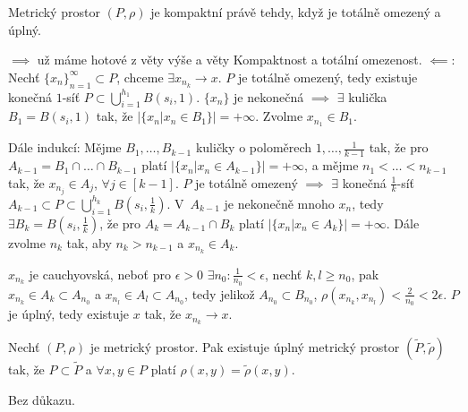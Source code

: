 \documentclass[12pt]{article}					%
\begin{document}
		\begin{veta}
			Metrický prostor $(P, \rho)$ je kompaktní právě tehdy, když je totálně omezený a úplný.

			\begin{dukazin}
				$\implies$ už máme hotové z věty výše a věty Kompaktnost a totální omezenost. $\impliedby$: Nechť $\{x_n\}_{n=1}^∞ \subset P$, chceme $\exists x_{n_k} \rightarrow x$. $P$ je totálně omezený, tedy existuje konečná $1$-síť $P \subset \bigcup_{i=1}^{h_1} B(s_i, 1)$. $\{x_n\}$ je nekonečná $\implies$ $\exists$ kulička $B_1 = B(s_i, 1)$ tak, že $|\{x_n | x_n \in B_1\}| = +∞$. Zvolme $x_{n_1} \in B_1$.

				Dále indukcí: Mějme $B_1, …, B_{k-1}$ kuličky o poloměrech $1, …, \frac{1}{k-1}$ tak, že pro $A_{k-1} = B_1 \cap … \cap B_{k-1}$ platí $|\{x_n | x_n \in A_{k-1}\}| = +∞$, a mějme $n_1 < … < n_{k-1}$ tak, že $x_{n_j} \in A_j$, $\forall j \in [k-1]$. $P$ je totálně omezený $\implies$ $\exists$ konečná $\frac{1}{k}$-síť $A_{k-1} \subset P \subset \bigcup_{i=1}^{h_k} B(s_i, \frac{1}{k})$. V $A_{k-1}$ je nekonečně mnoho $x_n$, tedy $\exists B_k = B(s_i, \frac{1}{k})$, že pro $A_k = A_{k-1} \cap B_k$ platí $|\{x_n | x_n \in A_k\}| = +∞$. Dále zvolme $n_k$ tak, aby $n_k > n_{k-1}$ a $x_{n_k} \in A_k$.

				$x_{n_k}$ je cauchyovská, neboť pro $\epsilon > 0$ $\exists n_0: \frac{1}{n_0} < \epsilon$, nechť $k, l ≥ n_0$, pak $x_{n_k} \in A_k \subset A_{n_0}$ a $x_{n_l} \in A_l \subset A_{n_0}$, tedy jelikož $A_{n_0} \subset B_{n_0}$, $\rho(x_{n_k}, x_{n_l}) < \frac{2}{n_0} < 2\epsilon$. $P$ je úplný, tedy existuje $x$ tak, že $x_{n_k} \rightarrow x$.
			\end{dukazin}
		\end{veta}

		\begin{veta}
			Nechť $(P, \rho)$ je metrický prostor. Pak existuje úplný metrický prostor $(\tilde P, \tilde \rho)$ tak, že $P \subset \tilde P$ a $\forall x, y \in P$ platí $\rho(x, y) = \tilde \rho(x, y)$.

			\begin{dukazin}
				Bez důkazu.
			\end{dukazin}
		\end{veta}
\end{document}
